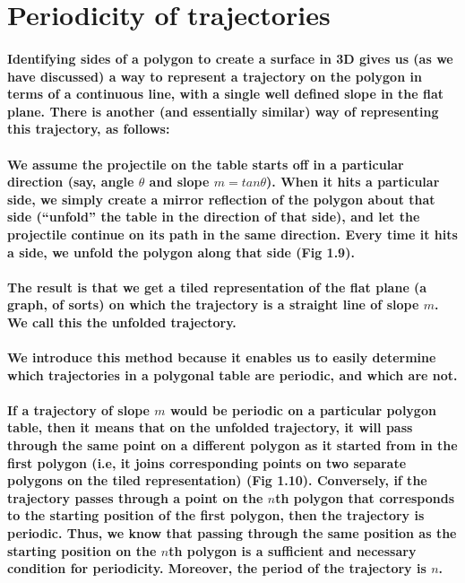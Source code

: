 \documentclass{report}
\begin{document}
\section{Periodicity of trajectories}

\paragraph{Identifying sides of a polygon to create a surface in 3D gives us (as we have discussed) a way to represent a trajectory on the polygon in terms of a continuous line, with a single well defined slope in the flat plane. There is another (and essentially similar) way of representing this trajectory, as follows:}

\paragraph{We assume the projectile on the table starts off in a particular direction (say, angle $\theta$ and slope $m = tan\theta$). When it hits a particular side, we simply create a mirror reflection of the polygon about that side (“unfold” the table in the direction of that side), and let the projectile continue on its path in the same direction. Every time it hits a side, we unfold the polygon along that side (Fig 1.9).}


\paragraph{The result is that we get a tiled representation of the flat plane (a graph, of sorts) on which the trajectory is a straight line of slope $m$. We call this the unfolded trajectory.}

\paragraph{We introduce this method because it enables us to easily determine which trajectories in a polygonal table are periodic, and which are not.}


\paragraph{If a trajectory of slope $m$ would be periodic on a particular polygon table, then it means that on the unfolded trajectory, it will pass through the same point on a different polygon as it started from in the first polygon (i.e, it joins corresponding points on two separate polygons on the tiled representation) (Fig 1.10). Conversely, if the trajectory passes through a point on the $n$th polygon that corresponds to the starting position of the first polygon, then the trajectory is periodic. Thus, we know that passing through the same position as the starting position on the $n$th polygon is a sufficient and necessary condition for periodicity. Moreover, the period of the trajectory is $n$.}
\end{document}
